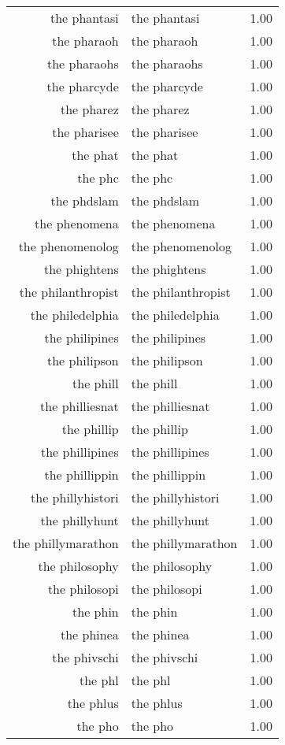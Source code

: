 \begin{table}[ht]
\begin{tabular}{rlr}
  the phantasi & the phantasi & 1.00 \\ 
  the pharaoh & the pharaoh & 1.00 \\ 
  the pharaohs & the pharaohs & 1.00 \\ 
  the pharcyde & the pharcyde & 1.00 \\ 
  the pharez & the pharez & 1.00 \\ 
  the pharisee & the pharisee & 1.00 \\ 
  the phat & the phat & 1.00 \\ 
  the phc & the phc & 1.00 \\ 
  the phdslam & the phdslam & 1.00 \\ 
  the phenomena & the phenomena & 1.00 \\ 
  the phenomenolog & the phenomenolog & 1.00 \\ 
  the phightens & the phightens & 1.00 \\ 
  the philanthropist & the philanthropist & 1.00 \\ 
  the philedelphia & the philedelphia & 1.00 \\ 
  the philipines & the philipines & 1.00 \\ 
  the philipson & the philipson & 1.00 \\ 
  the phill & the phill & 1.00 \\ 
  the philliesnat & the philliesnat & 1.00 \\ 
  the phillip & the phillip & 1.00 \\ 
  the phillipines & the phillipines & 1.00 \\ 
  the phillippin & the phillippin & 1.00 \\ 
  the phillyhistori & the phillyhistori & 1.00 \\ 
  the phillyhunt & the phillyhunt & 1.00 \\ 
  the phillymarathon & the phillymarathon & 1.00 \\ 
  the philosophy & the philosophy & 1.00 \\ 
  the philosopi & the philosopi & 1.00 \\ 
  the phin & the phin & 1.00 \\ 
  the phinea & the phinea & 1.00 \\ 
  the phivschi & the phivschi & 1.00 \\ 
  the phl & the phl & 1.00 \\ 
  the phlus & the phlus & 1.00 \\ 
  the pho & the pho & 1.00 \\ 

\end{tabular}
\end{table}
